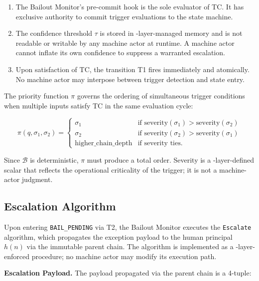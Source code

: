 \begin{enumerate}\itemsep=0pt
\item The Bailout Monitor's pre-commit hook is the sole evaluator of TC. It has exclusive authority to commit trigger evaluations to the state machine.
\item The confidence threshold $\tau$ is stored in \fact-layer-managed memory and is not readable or writable by any machine actor at runtime. A machine actor cannot inflate its own confidence to suppress a warranted escalation.
\item Upon satisfaction of TC, the transition T1 fires immediately and atomically. No machine actor may interpose between trigger detection and state entry.
\end{enumerate}

The priority function $\pi$ governs the ordering of simultaneous trigger conditions when multiple inputs satisfy TC in the same evaluation cycle:

\[
\pi(q, \sigma_1, \sigma_2) =
\begin{cases}
\sigma_1 & \text{if } \text{severity}(\sigma_1) > \text{severity}(\sigma_2) \\
\sigma_2 & \text{if } \text{severity}(\sigma_2) > \text{severity}(\sigma_1) \\
\text{higher\_chain\_depth} & \text{if severity ties.}
\end{cases}
\]

Since $\mathcal{B}$ is deterministic, $\pi$ must produce a total order. Severity is a \fact-layer-defined scalar that reflects the operational criticality of the trigger; it is not a machine-actor judgment.

\subsection{Escalation Algorithm}\label{sec:escalation}

Upon entering \texttt{BAIL\_PENDING} via T2, the Bailout Monitor executes the \texttt{Escalate} algorithm, which propagates the exception payload to the human principal $h(n)$ via the immutable parent chain. The algorithm is implemented as a \fact-layer-enforced procedure; no machine actor may modify its execution path.

\medskip
\noindent\textbf{Escalation Payload.} The payload propagated via the parent chain is a 4-tuple:

